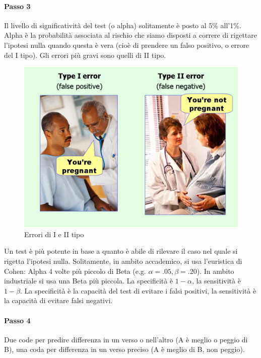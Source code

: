 \documentclass[11pt,a4paper]{book}
\begin{document}
\paragraph{Passo 3}
Il livello di significatività del test (o alpha) solitamente è posto al 5\% all'1\%. Alpha è la probabilità associata al rischio che siamo disposti a correre di rigettare l'ipotesi nulla quando questa è vera (cioè di prendere un falso positivo, o errore del I tipo). Gli errori più gravi sono quelli di II tipo.
\begin{figure}[h!]
	\begin{center}
		\includegraphics[scale=0.6]{img/029.jpg}
		\caption{Errori di I e II tipo}
		\label{fig: 029}
	\end{center}
\end{figure}

Un test è più potente in base a quanto è abile di rilevare il caso nel quale si rigetta l'ipotesi nulla. Solitamente, in ambito accademico, si usa l'euristica di Cohen: Alpha 4 volte più piccolo di Beta (e.g. $\alpha=.05, \beta=.20$). In ambito industriale si usa una Beta più piccola. La specificità è $1-\alpha$, la sensitività è $1-\beta$. La specificità è la capacità del test di evitare i falsi positivi, la sensitività è la capacità di evitare falsi negativi.

\paragraph{Passo 4}
Due code per predire differenza in un verso o nell'altro (A è meglio o peggio di B), una coda per differenza in un verso preciso (A è meglio di B, non peggio).
\end{document}
